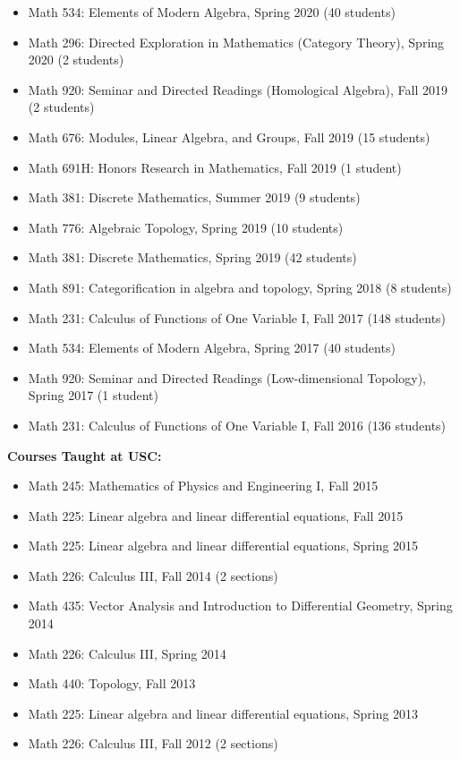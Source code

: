 \documentclass[10pt]{article}
\begin{document}
\begin{itemize}
\item Math 534: Elements of Modern Algebra, Spring 2020 (40 students)
\item Math 296: Directed Exploration in Mathematics (Category Theory), Spring 2020 (2 students)
\item Math 920: Seminar and Directed Readings (Homological Algebra), Fall 2019 (2 students)
\item Math 676: Modules, Linear Algebra, and Groups, Fall 2019 (15 students) %
\item Math 691H: Honors Research in Mathematics, Fall 2019 (1 student)
\item Math 381: Discrete Mathematics, Summer 2019 (9 students)
\item Math 776: Algebraic Topology, Spring 2019 (10 students) %
\item Math 381: Discrete Mathematics, Spring 2019 (42 students) %
\item Math 891: Categorification in algebra and topology, Spring 2018 (8 students) %
\item Math 231: Calculus of Functions of One Variable I, Fall 2017 (148 students)
\item Math 534: Elements of Modern Algebra, Spring 2017 (40 students) %
\item Math 920: Seminar and Directed Readings (Low-dimensional Topology), Spring 2017 (1 student)
\item Math 231: Calculus of Functions of One Variable I, Fall 2016 (136 students) %
\end{itemize}

\smallskip
\noindent\textbf{Courses Taught at USC:}
\begin{itemize}
\item Math 245: Mathematics of Physics and Engineering I, Fall 2015
\item Math 225: Linear algebra and linear differential equations, Fall 2015
\item Math 225: Linear algebra and linear differential equations, Spring 2015 
\item Math 226: Calculus III, Fall 2014 (2 sections)
\item Math 435: Vector Analysis and Introduction to Differential Geometry, Spring 2014
\item Math 226: Calculus III, Spring 2014
\item Math 440: Topology, Fall 2013
\item Math 225: Linear algebra and linear differential equations, Spring 2013
\item Math 226: Calculus III, Fall 2012 (2 sections)
\end{itemize}
\end{document}
